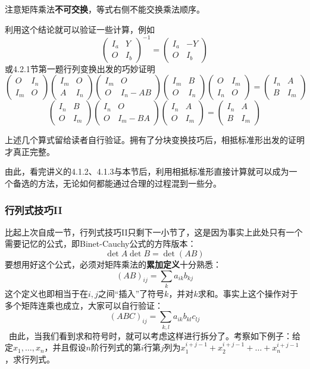 \documentclass[a4paper,UTF8,fontset=windows]{ctexart}
\newcommand*{\note}{\noindent *}
\begin{document}
\note 注意矩阵乘法\textbf{不可交换}，等式右侧不能交换乘法顺序。

利用这个结论就可以验证一些计算，例如
$$\begin{pmatrix}I_a&Y\\O&I_b\end{pmatrix}^{-1}=\begin{pmatrix}I_a&-Y\\O&I_b\end{pmatrix}$$
或4.2.1节第一题行列变换出发的巧妙证明
$$\begin{pmatrix}O&I_n\\I_m&O\end{pmatrix}\begin{pmatrix}I_m&O\\A&I_n\end{pmatrix}\begin{pmatrix}I_m&O\\O&I_n-AB\end{pmatrix}\begin{pmatrix}I_m&B\\O&I_n\end{pmatrix}\begin{pmatrix}O&I_m\\I_n&O\end{pmatrix}=\begin{pmatrix}I_n&A\\B&I_m\end{pmatrix}$$
$$\begin{pmatrix}I_n&B\\O&I_m\end{pmatrix}\begin{pmatrix}I_n&O\\O&I_m-BA\end{pmatrix}\begin{pmatrix}I_n&A\\O&I_m\end{pmatrix}=\begin{pmatrix}I_n&A\\B&I_m\end{pmatrix}$$

上述几个算式留给读者自行验证。拥有了分块变换技巧后，相抵标准形出发的证明才真正完整。

\note 由此，看完讲义的4.1.2、4.1.3与本节后，利用相抵标准形直接计算就可以成为一个备选的方法，无论如何都能通过合理的过程混到一些分。

\subsubsection{行列式技巧II}
比起上次自成一节，行列式技巧II只剩下一小节了，这是因为事实上此处只有一个需要记忆的公式，即Binet-Cauchy公式的方阵版本：
$$\det A\det B=\det(AB)$$
要想用好这个公式，必须对矩阵乘法的\textbf{累加定义}十分熟悉：
$$(AB)_{ij}=\sum_ka_{ik}b_{kj}$$
这个定义也即相当于在$i,j$之间``插入''了符号$k$，并对$k$求和。事实上这个操作对于多个矩阵连乘也成立，大家可以自行验证：
$$(ABC)_{ij}=\sum_{k,l}a_{ik}b_{kl}c_{lj}$$\
由此，当我们看到求和符号时，就可以考虑这样进行拆分了。考察如下例子：给定$x_1,\dots,x_n$，并且假设$n$阶行列式的第$i$行第$j$列为$x_1^{i+j-1}+x_2^{i+j-1}+\dots+x_n^{i+j-1}$，求行列式。
\end{document}
